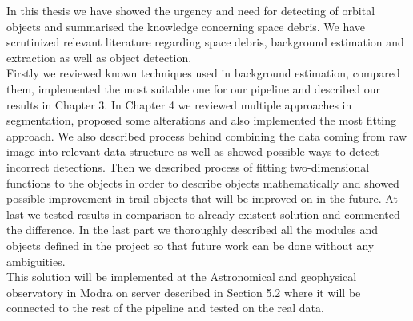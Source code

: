 \documentclass[12pt, a4paper, oneside]{book}
\begin{document}
In this thesis we have showed the urgency and need for detecting of orbital objects and summarised the knowledge concerning space debris.
We have scrutinized relevant literature regarding space debris, background estimation and extraction as well as object detection.\\
Firstly we reviewed known techniques used in background estimation, compared them, implemented the most suitable one for our pipeline and described our results in Chapter 3.
In Chapter 4 we reviewed multiple approaches in segmentation, proposed some alterations and also implemented the most fitting approach.
We also described process behind combining the data coming from raw image into relevant data structure as well as showed possible ways to detect incorrect detections.
Then we described process of fitting two-dimensional functions to the objects in order to describe objects mathematically and showed possible improvement in trail objects that will be improved on in the future.
At last we tested results in comparison to already existent solution and commented the difference.
In the last part we thoroughly described all the modules and objects defined in the project so that future work can be done without any ambiguities.\\
This solution will be implemented at the Astronomical and geophysical observatory in Modra on server described in Section 5.2 where it will be connected to the rest of the pipeline and tested on the real data.

\backmatter




\listoffigures
\end{document}
